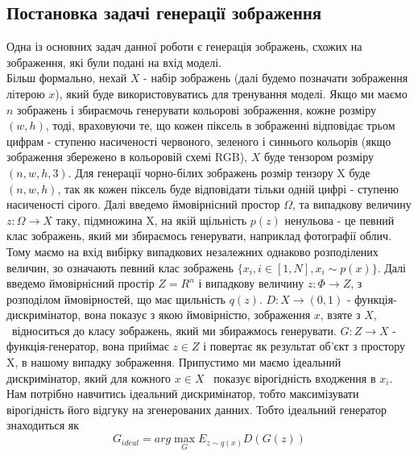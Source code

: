 \documentclass{article}
\begin{document}
	\subsection{Постановка задачі генерації зображення}
	\null\quad Одна із основних задач данної роботи є генерація зображень, схожих на зображення, які були подані на вхід моделі.  \\
	\null\quad Більш формально, нехай $X$ - набір зображень (далі будемо позначати зображення літерою $x$), який буде використовуватись для тренування моделі. Якщо ми маємо $n$ зображень і збираємочь генерувати кольорові зображення, кожне розміру $(w, h)$, тоді, враховуючи те, що кожен піксель в зображенні відповідає трьом цифрам - ступеню насиченості червоного, зеленого і синнього кольорів (якщо зображення збережено в кольоровій схемі RGB), $X$ буде тензором розміру $(n, w, h, 3)$. Для генерації чорно-білих зображень розмір тензору X буде $(n, w, h)$, так як кожен піксель буде відповідати тільки одній цифрі -  ступеню насиченості сірого. Далі введемо ймовірнісний простор $\Omega$, та випадкову величину $z: \Omega \rightarrow X$ таку, підмножина X, на якій щільність $p(z)$ ненульова - це певний клас зображень, який ми збираємось генерувати, наприклад фотографії облич. Тому маємо на вхід вибірку випадкових незалежних однаково розподілених величин, зо означають певний клас зображень $\{x_i, i \in [1, N], x_i \sim p(x)\}$. Далі введемо ймовірнісний простір $Z = R^n$ і випадкову величину $z: \Phi \rightarrow Z$, з розподілом ймовірностей, що має щильність $q(z)$. $D: X \rightarrow (0, 1)$ - функція-дискримінатор, вона показує з якою ймовірністю, зображення $x$, взяте з $X$,  відноситься до класу зображень, який ми збиражмось генерувати. $G: Z \rightarrow X$ - функція-генератор, вона приймає $z \in Z$ і повертає як результат об'єкт з простору X, в нашому випадку зображення. Припустимо ми маємо ідеальний дискримінатор, який для кожного $x \in X$  показує вірогідність входження в ${x_i}$.  Нам потрібно навчитись  ідеальний дискримінатор, тобто максимізувати вірогідність його відгуку на згенерованих данних. Тобто ідеальний генератор знаходиться як $$G_{ideal} = arg \max_{G} E_{z \sim q(x)} D(G(z))$$\\
\end{document}
